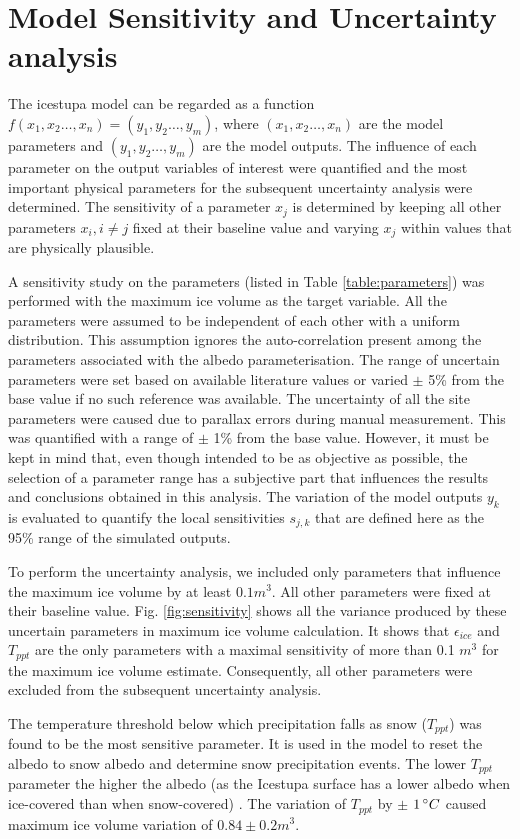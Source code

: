 \documentclass[utf8]{frontiersSCNS} %
\begin{document}
\section{Model Sensitivity and Uncertainty analysis}

The icestupa model can be regarded as a function $f(x_1,x_2 \dots, x_n) = (y_1,y_2 \dots, y_m)$, where $(x_1,x_2
\dots, x_n)$ are the model parameters and $(y_1,y_2 \dots, y_m)$ are the model outputs. The influence of each
parameter on the output variables of interest were quantified and the most important physical parameters for the
subsequent uncertainty analysis were determined. The sensitivity of a parameter $x_j$ is determined by keeping all
other parameters $x_i, i \neq j$ fixed at their baseline value and varying $x_j$ within values that are physically
plausible.

A sensitivity study on the parameters (listed in Table \ref{table:parameters}) was performed with the maximum ice
volume as the target variable. All the parameters were assumed to be independent of each other with a uniform
distribution.  This assumption ignores the auto-correlation present among the parameters associated with the albedo
parameterisation.  The range of uncertain parameters were set based on available literature values or varied $\pm$ 5\%
from the base value if no such reference was available. The uncertainty of all the site parameters were caused due to
parallax errors during manual measurement. This was quantified with a range of $\pm$ 1\% from the base value. However,
it must be kept in mind that, even though intended to be as objective as possible, the selection of a parameter range
has a subjective part that influences the results and conclusions obtained in this analysis.  The variation of the
model outputs $y_k$ is evaluated to quantify the local sensitivities $s_{j,k}$ that are defined here as the 95\% range
of the simulated outputs.

To perform the uncertainty analysis, we included only parameters that influence the maximum ice volume by at least
$0.1 m^3$. All other parameters were fixed at their baseline value.  Fig. \ref{fig:sensitivity} shows all the variance
produced by these uncertain parameters in maximum ice volume calculation. It shows that $\epsilon_{ice}$ and $T_{ppt}$
are the only parameters with a maximal sensitivity of more than 0.1 $m^3$ for the maximum ice volume estimate.
Consequently, all other parameters were excluded from the subsequent uncertainty analysis. 

The temperature threshold below which precipitation falls as snow ($T_{ppt}$) was found to be the most sensitive
parameter. It is used in the model to reset the albedo to snow albedo and determine snow precipitation events. The
lower $T_{ppt}$ parameter the higher the albedo (as the Icestupa surface has a lower albedo when ice-covered than when
snow-covered) . The variation of $T_{ppt}$ by $\pm$ $1\,\degree C$ caused maximum ice volume variation of $0.84 \pm
0.2 m^3$. 
\end{document}
